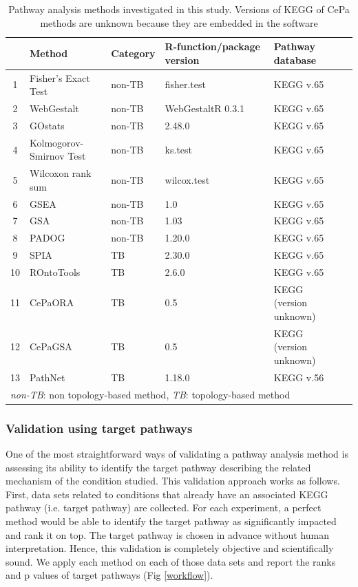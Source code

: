 \begin{table}

\centering
\caption{Pathway analysis methods investigated in this study. Versions of KEGG of CePa methods are unknown because they are embedded in the software\label{table:PAmethods}} 
\small
\begin{tabular}{@{}clllll@{}}\hline
 & Method & Category  & R-function/package version & Pathway database \\\hline
1 & Fisher's Exact Test &	non-TB 	& fisher.test & KEGG v.65\\ 
2 & WebGestalt &	non-TB 	& WebGestaltR 0.3.1 & KEGG v.65\\ 
3 & GOstats &	non-TB 	&2.48.0 & KEGG v.65\\ 
4 & Kolmogorov-Smirnov Test& non-TB & ks.test & KEGG v.65\\
5 & Wilcoxon rank sum	& non-TB 	& wilcox.test &  KEGG v.65\\
6 & GSEA &	non-TB & 1.0 & KEGG v.65\\
7 & GSA &	non-TB & 1.03 & KEGG v.65\\
8 & PADOG &	non-TB & 1.20.0 & KEGG v.65\\
9 & SPIA &	TB  & 2.30.0 & KEGG v.65\\
10 & ROntoTools &		TB & 2.6.0 & KEGG v.65\\
11 & CePaORA &	TB & 0.5 & KEGG (version unknown)\\
12 & CePaGSA &	TB & 0.5 & KEGG (version unknown)\\
13 & PathNet &	TB & 1.18.0 & KEGG v.56\\
\hline
\multicolumn{5}{l}{\textit{non-TB}: non topology-based method, \textit{TB}: topology-based method}

\end{tabular}
\end{table}


\subsubsection{Validation using target pathways}

One of the most straightforward ways of validating a pathway analysis method is assessing its ability to identify the target pathway describing the related mechanism of the condition studied. 
This validation approach works as follows. First, data sets related to  conditions that already have an associated KEGG pathway (i.e. target pathway) are collected. For each experiment, a perfect method would be able to identify the target pathway as significantly impacted and rank it on top. The target pathway is chosen in advance without human interpretation. Hence, this validation is completely objective and scientifically sound. We apply each method on each of those data sets and report the ranks and p values of target pathways (Fig \ref{workflow}).

